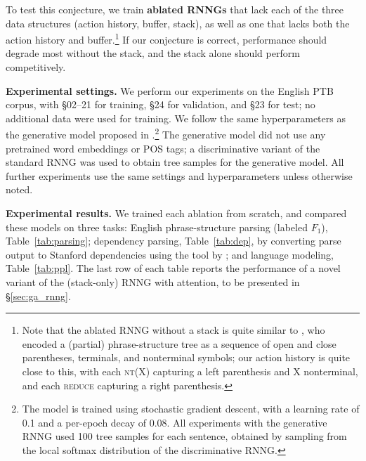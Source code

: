 \documentclass[11pt]{article}
\begin{document}
To test this conjecture, we train \textbf{ablated RNNGs} that lack each of the three data structures (action history, buffer, stack), as well as one that lacks both the action history and buffer.\footnote{Note that the ablated RNNG without a stack is quite similar to , who encoded a (partial)
 phrase-structure tree as a sequence of open and close parentheses, terminals, and nonterminal symbols; our action history is quite close to this, with each \textsc{nt}(X) capturing a left parenthesis and X nonterminal, and each \textsc{reduce} capturing a right parenthesis.}
If our conjecture is correct, performance should degrade most without the stack, and the stack alone should perform competitively.


\textbf{Experimental settings.} We perform our experiments on the English PTB corpus, with \S02--21 for training, \S24 for validation, and \S23 for test; no additional data were used for training. We follow the same hyperparameters as the generative model proposed in .\footnote{The model is trained using stochastic gradient descent, with a learning rate of 0.1 and a per-epoch decay of 0.08. All experiments with the generative RNNG used 100 tree samples for each sentence, obtained by sampling from the local softmax distribution of the discriminative RNNG.} The generative model did not use any pretrained word embeddings or POS tags; a discriminative variant of the standard RNNG was used to obtain tree samples for the generative model. All further experiments use the same settings and hyperparameters unless otherwise noted.

\textbf{Experimental results.} 
We trained each ablation from scratch, and compared these models on three tasks:  English phrase-structure parsing (labeled $F_1$), Table~\ref{tab:parsing}; dependency parsing, Table~\ref{tab:dep}, by converting parse output to Stanford dependencies \cite{demarneffe-06} using the tool by ; and language modeling, Table~\ref{tab:ppl}.  The last row of each table reports the performance of a novel variant of the (stack-only) RNNG with attention, to be presented in \S\ref{sec:ga_rnng}.
\end{document}
